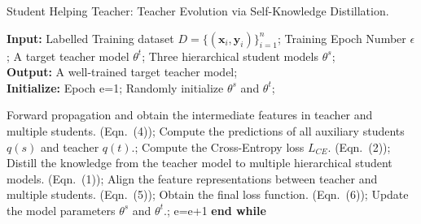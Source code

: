 \documentclass[letterpaper]{article} %
\begin{document}
\begin{algorithm}[t]
	\caption{Student Helping Teacher: Teacher Evolution via Self-Knowledge Distillation.}
	\hspace*{0.02in} {\bf Input:}
	Labelled Training dataset $D=\{(\textbf{x}_{i},\textbf{y}_{i})\}_{i=1}^{n}$; Training Epoch Number $\epsilon$; A target teacher model $\theta^{t}$; Three hierarchical student models $\theta^{s}$; \\
	\hspace*{0.02in} {\bf Output:}
	A well-trained target teacher model; \\
	\hspace*{0.02in} {\bf Initialize:}
	Epoch e=1; Randomly initialize $\theta^{s}$ and $\theta^{t}$;
	
	\begin{algorithmic}[1]
		\State Forward propagation and obtain the intermediate features in teacher and multiple students. (Eqn.~(4));
		\State Compute the predictions of all auxiliary students $q(s)$ and teacher $q(t)$.;
		\State Compute the Cross-Entropy loss $L_{CE}$. (Eqn.~(2));
		\State Distill the knowledge from the teacher model to multiple hierarchical student models. (Eqn.~(1));
		\State Align the feature representations between teacher and multiple students. (Eqn.~(5));
		\State Obtain the final loss function. (Eqn.~(6));
		\State Update the model parameters $\theta^{s}$ and $\theta^{t}$.;
		\State e=e+1
		\EndWhile
		\State \textbf{end while}
	\end{algorithmic}
	\label{algo:demo}
\end{algorithm}
\end{document}
